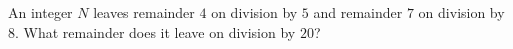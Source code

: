 An integer $N$ leaves remainder $4$ on division by $5$ and remainder $7$ on division by $8$. What remainder does it leave on division by $20$?
